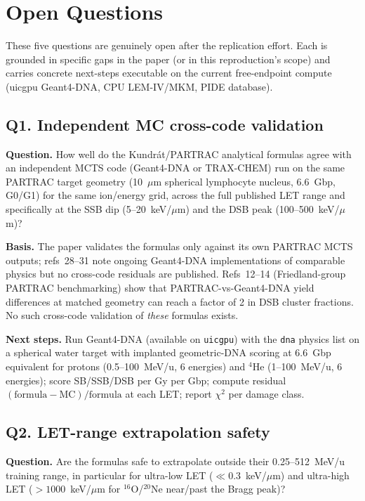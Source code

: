 \section{Open Questions}
\label{sec:open-questions}

These five questions are genuinely open after the replication effort. Each is grounded in specific gaps in the paper (or in this reproduction's scope) and carries concrete next-steps executable on the current free-endpoint compute (uicgpu Geant4-DNA, CPU LEM-IV/MKM, PIDE database).

\subsection*{Q1. Independent MC cross-code validation}
\textbf{Question.} How well do the Kundr\'at/PARTRAC analytical formulas agree with an independent MCTS code (Geant4-DNA or TRAX-CHEM) run on the same PARTRAC target geometry (10~$\mu$m spherical lymphocyte nucleus, 6.6~Gbp, G0/G1) for the same ion/energy grid, across the full published LET range and specifically at the SSB dip (5--20~keV/$\mu$m) and the DSB peak (100--500~keV/$\mu$m)?

\textbf{Basis.} The paper validates the formulas only against its own PARTRAC MCTS outputs; refs~28--31 note ongoing Geant4-DNA implementations of comparable physics but no cross-code residuals are published. Refs~12--14 (Friedland-group PARTRAC benchmarking) show that PARTRAC-vs-Geant4-DNA yield differences at matched geometry can reach a factor of 2 in DSB cluster fractions. No such cross-code validation of \emph{these} formulas exists.

\textbf{Next steps.} Run Geant4-DNA (available on \texttt{uicgpu}) with the \texttt{dna} physics list on a spherical water target with implanted geometric-DNA scoring at 6.6~Gbp equivalent for protons (0.5--100~MeV/u, 6 energies) and $^{4}$He (1--100~MeV/u, 6 energies); score SB/SSB/DSB per Gy per Gbp; compute residual $(\text{formula}-\text{MC})/\text{formula}$ at each LET; report $\chi^2$ per damage class.

\subsection*{Q2. LET-range extrapolation safety}
\textbf{Question.} Are the formulas safe to extrapolate outside their 0.25--512~MeV/u training range, in particular for ultra-low LET ($\ll 0.3$~keV/$\mu$m) and ultra-high LET ($>1000$~keV/$\mu$m for $^{16}$O/$^{20}$Ne near/past the Bragg peak)?

